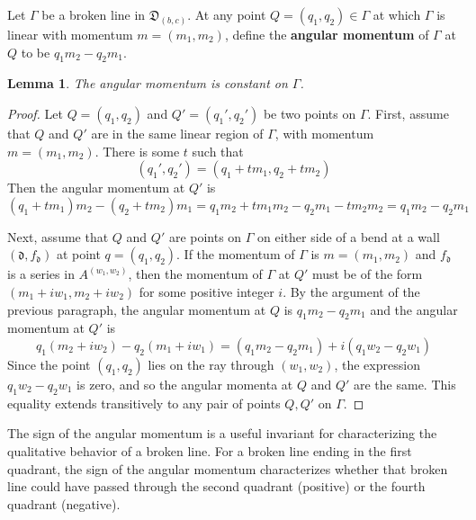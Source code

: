\documentclass[11pt]{amsart}
\newtheorem{lemma}{Lemma}[section]
\theoremstyle{remark}
\numberwithin{equation}{section}
\newcommand{\fd}{\mathfrak{d}}
\begin{document}
Let $\Gamma$ be a broken line in $\mathfrak{D}_{(b,c)}$.  At any point $Q=(q_1,q_2)\in \Gamma$ at which $\Gamma$ is linear with momentum $m=(m_1,m_2)$, define the \textbf{angular momentum} of $\Gamma$ at $Q$ to be $q_1m_2-q_2m_1$.
\begin{lemma}
The angular momentum is constant on $\Gamma$.
\end{lemma}
\begin{proof}
Let $Q=(q_1,q_2)$ and $Q'=(q_1',q_2')$ be two points on $\Gamma$.
First, assume that $Q$ and $Q'$ are in the same linear region of $\Gamma$, with momentum $m=(m_1,m_2)$.  There is some $t$ such that 
\[ (q_1',q_2') = (q_1+tm_1,q_2+tm_2) \]
Then the angular momentum at $Q'$ is 
\[ (q_1+tm_1)m_2-(q_2+tm_2)m_1 = q_1m_2+tm_1m_2-q_2m_1-tm_2m_2 = q_1m_2 - q_2m_1 \]

Next, assume that $Q$ and $Q'$ are points on $\Gamma$ on either side of a bend at a wall $(\fd, f_{\fd})$ at point $q=(q_1,q_2)$.  If the momentum of $\Gamma$ is $m=(m_1,m_2)$ and $f_{\fd}$ is a series in $A^{(w_1,w_2)}$, then the momentum of $\Gamma$ at $Q'$ must be of the form $(m_1+iw_1,m_2+iw_2)$ for some positive integer $i$.  By the argument of the previous paragraph, the angular momentum at $Q$ is $q_1m_2-q_2m_1$
and the angular momentum at $Q'$ is
\[ q_1(m_2+iw_2)-q_2(m_1+iw_1) = (q_1m_2-q_2m_1)+i(q_1w_2-q_2w_1) \]
Since the point $(q_1,q_2)$ lies on the ray through $(w_1,w_2)$, the expression $q_1w_2-q_2w_1$ is zero, and so the angular momenta at $Q$ and $Q'$ are the same.  This equality extends transitively to any pair of points $Q,Q'$ on $\Gamma$.
\end{proof}
The sign of the angular momentum is a useful invariant for characterizing the qualitative behavior of a broken line.
For a broken line ending in the first quadrant, the sign of the angular momentum characterizes whether that broken line could have passed through the second quadrant (positive) or the fourth quadrant (negative).
\end{document}
